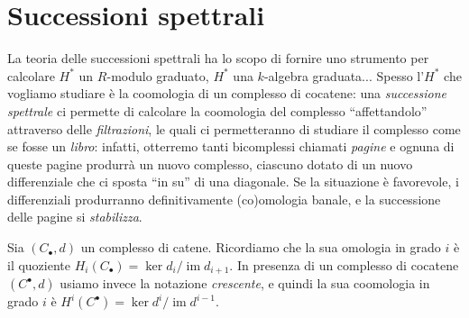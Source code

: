\chapter{Successioni spettrali}

La teoria delle successioni spettrali ha lo scopo di
fornire uno strumento per calcolare $H^{*}$ un $R$-modulo graduato,
$H^{*}$ una $k$-algebra graduata...
Spesso l'$H^{*}$ che vogliamo studiare è
la coomologia di un complesso di cocatene:
una \emph{successione spettrale} ci permette di calcolare 
la coomologia del complesso
``affettandolo'' attraverso delle \emph{filtrazioni},
le quali ci permetteranno di studiare il complesso come se fosse un \emph{libro}:
infatti, otterremo tanti bicomplessi chiamati \emph{pagine} e
ognuna di queste pagine produrrà un nuovo complesso,
ciascuno dotato di un nuovo differenziale che ci sposta ``in su'' di una diagonale.
Se la situazione è favorevole, i differenziali produrranno definitivamente
(co)omologia banale, e la successione delle pagine si \emph{stabilizza}.


%
%




Sia $(C_{\bullet}, d)$ un complesso di catene.
Ricordiamo che la sua omologia in grado $i$ è il quoziente 
$H_{i}(C_{\bullet}) = \ker d_{i}/\operatorname{im} d_{i+1}$.
In presenza di un complesso di cocatene $(C^{\bullet},d)$
usiamo invece la notazione \emph{crescente},
e quindi la sua coomologia in grado $i$ è 
$H^{i}(C^{\bullet}) = \ker d^{i}/\operatorname{im} d^{i-1}$.

